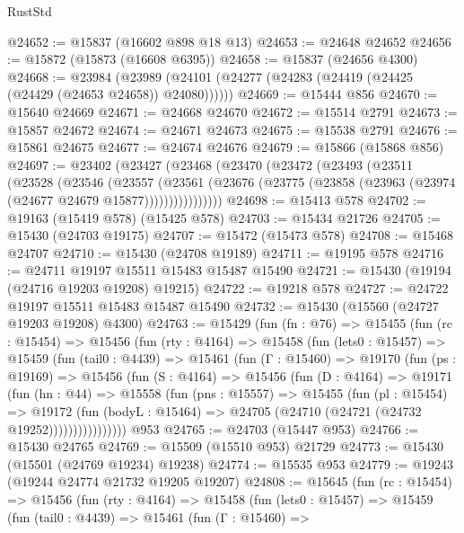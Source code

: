 \begin{lexlean}{RustStd}
\begin{coremodule}
@24652 := @15837 (@16602 @898 @18 @13)
@24653 := @24648 @24652
@24656 := @15872 (@15873 (@16608 @6395))
@24658 := @15837 (@24656 @4300)
@24668 := @23984
    (@23989 (@24101 (@24277 (@24283 (@24419 (@24425 (@24429 (@24653 @24658)) @24080))))))
@24669 := @15444 @856
@24670 := @15640 @24669
@24671 := @24668 @24670
@24672 := @15514 @2791
@24673 := @15857 @24672
@24674 := @24671 @24673
@24675 := @15538 @2791
@24676 := @15861 @24675
@24677 := @24674 @24676
@24679 := @15866 (@15868 @856)
@24697 := @23402
    (@23427
      (@23468
        (@23470
          (@23472
            (@23493
              (@23511
                (@23528
                  (@23546
                    (@23557
                      (@23561
                        (@23676
                          (@23775 (@23858 (@23963 (@23974 (@24677 @24679 @15877))))))))))))))))
@24698 := @15413 @578
@24702 := @19163 (@15419 @578) (@15425 @578)
@24703 := @15434 @21726
@24705 := @15430 (@24703 @19175)
@24707 := @15472 (@15473 @578)
@24708 := @15468 @24707
@24710 := @15430 (@24708 @19189)
@24711 := @19195 @578
@24716 := @24711 @19197 @15511 @15483 @15487 @15490
@24721 := @15430 (@19194 (@24716 @19203 @19208) @19215)
@24722 := @19218 @578
@24727 := @24722 @19197 @15511 @15483 @15487 @15490
@24732 := @15430 (@15560 (@24727 @19203 @19208) @4300)
@24763 := @15429
    (fun (fn : @76) =>
    @15455
      (fun (rc : @15454) =>
      @15456
        (fun (rty : @4164) =>
        @15458
          (fun (lets0 : @15457) =>
          @15459
            (fun (tail0 : @4439) =>
            @15461
              (fun (Γ : @15460) =>
              @19170
                (fun (ps : @19169) =>
                @15456
                  (fun (S : @4164) =>
                  @15456
                    (fun (D : @4164) =>
                    @19171
                      (fun (hn : @44) =>
                      @15558
                        (fun (pns : @15557) =>
                        @15455
                          (fun (pl : @15454) =>
                          @19172
                            (fun (bodyL : @15464) =>
                            @24705 (@24710 (@24721 (@24732 @19252))))))))))))))))
    @953
@24765 := @24703 (@15447 @953)
@24766 := @15430 @24765
@24769 := @15509 (@15510 @953) @21729
@24773 := @15430 (@15501 (@24769 @19234) @19238)
@24774 := @15535 @953
@24779 := @19243 (@19244 @24774 @21732 @19205 @19207)
@24808 := @15645
    (fun (rc : @15454) =>
    @15456
      (fun (rty : @4164) =>
      @15458
        (fun (lets0 : @15457) =>
        @15459
          (fun (tail0 : @4439) =>
          @15461
            (fun (Γ : @15460) =>

\end{coremodule}
\end{lexlean}
